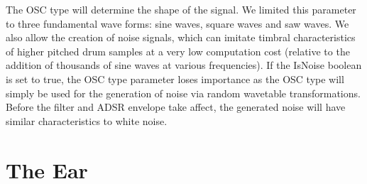 \documentclass[\main/thesis.tex]{subfiles}
\begin{document}
The OSC type will determine the shape of the signal. We limited this parameter to three fundamental wave forms: sine waves, square waves and saw waves. We also allow the creation of noise signals, which can imitate timbral characteristics of higher pitched drum samples at a very low computation cost (relative to the addition of thousands of sine waves at various frequencies). If the IsNoise boolean is set to true, the OSC type parameter loses importance as the OSC type will simply be used for the generation of noise via random wavetable transformations. Before the filter and ADSR envelope take affect, the generated noise will have similar characteristics to white noise. 

\begin{table}[h!]
\centering
{}
\caption{Synthesizer submodule Parameters. Despite the simplicity of the parameters and our efforts at constraining the ranges, the number of parameters that can be randomly chosen for each submodule is in the order of $10^{15}$ }
\label{table:submodule_params}
\end{table}


\section{The Ear}
\end{document}
